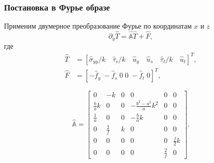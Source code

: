 \begin{frame}
    \frametitle{Постановка в Фурье образе}
    Применим двумерное преобразование Фурье по координатам $x$ и $z$
    \begin{equation}
        \partial_y \hat{T} = \hat{\mathbb{A}} \hat{T} + \hat{F},
    \end{equation}
    где
    \begin{equation}
        \label{eq:FourierT}
        \begin{split}
            \hat{T} &= \left[\hat{\sigma}_{yy}/k \quad \hat{\tau}_s/k \quad \hat{u}_y \quad \hat{u}_s \quad  \hat{\tau}_t/k \quad  \hat{u}_t \right]^T, \\
            \hat{F} &= \left[-\hat{f}_y \; -\hat{f}_s \; 0 \; 0 \; -\hat{f}_t \; 0\right]^T,
        \end{split}
    \end{equation}

    \begin{equation}
        \label{eq:FourierA}
        \hat{\mathbb{A}} = 
        \left[\begin{array}{cccccc}
            0 & -k & 0 & 0 & 0 & 0 \\
            \frac{b}{a}k & 0 & 0 & -\frac{b^2-a^2}{a}k^2 & 0 & 0 \\
            \frac{1}{a} & 0 & 0 & -\frac{b}{a}k & 0 & 0 \\
            0 & \frac{2}{f} & k & 0 & 0 & 0 \\
            0 & 0 & 0 & 0 & 0 & \frac{f}{2}k \\
            0 & 0 & 0 & 0 & \frac{2}{f} & 0 
        \end{array}\right].
    \end{equation}
\end{frame}

